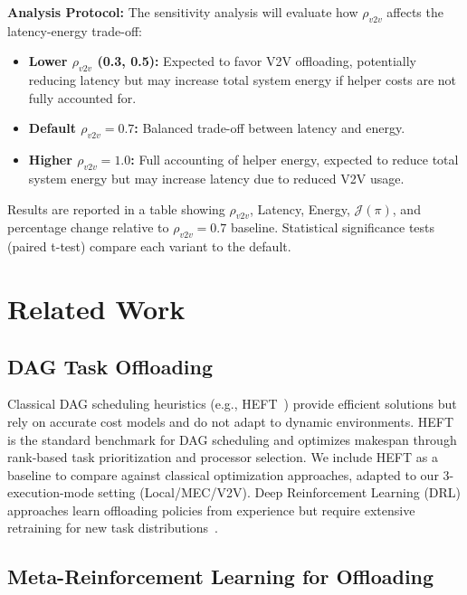 \documentclass[journal,twoside]{IEEEtran}
\begin{document}
\textbf{Analysis Protocol:}
The sensitivity analysis will evaluate how $\rho_{v2v}$ affects the latency-energy trade-off:
\begin{itemize}
    \item \textbf{Lower $\rho_{v2v}$ (0.3, 0.5):} Expected to favor V2V offloading, potentially reducing latency but may increase total system energy if helper costs are not fully accounted for.
    \item \textbf{Default $\rho_{v2v} = 0.7$:} Balanced trade-off between latency and energy.
    \item \textbf{Higher $\rho_{v2v} = 1.0$:} Full accounting of helper energy, expected to reduce total system energy but may increase latency due to reduced V2V usage.
\end{itemize}
Results are reported in a table showing $\rho_{v2v}$, Latency, Energy, $\mathcal{J}(\pi)$, and percentage change relative to $\rho_{v2v} = 0.7$ baseline. Statistical significance tests (paired t-test) compare each variant to the default.

    \section{Related Work}
\label{sec:related_work}

\subsection{DAG Task Offloading}

Classical DAG scheduling heuristics (e.g., HEFT~\cite{topcuoglu2002performance}) provide efficient solutions but rely on accurate cost models and do not adapt to dynamic environments. HEFT is the standard benchmark for DAG scheduling and optimizes makespan through rank-based task prioritization and processor selection. We include HEFT as a baseline to compare against classical optimization approaches, adapted to our 3-execution-mode setting (Local/MEC/V2V). Deep Reinforcement Learning (DRL) approaches learn offloading policies from experience but require extensive retraining for new task distributions~\cite{chen2019optimized, hu2019dynamic, xu2019deep}.

\subsection{Meta-Reinforcement Learning for Offloading}
\end{document}

